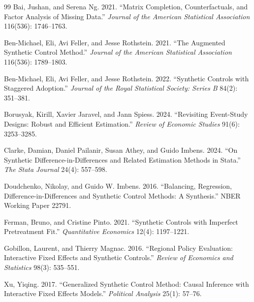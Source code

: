 \documentclass[11pt]{article}
\theoremstyle{definition}
\theoremstyle{plain}
\theoremstyle{remark}
\begin{document}
\begin{thebibliography}{99}
Bai, Jushan, and Serena Ng. 2021. ``Matrix Completion, Counterfactuals, and Factor Analysis of Missing Data.'' \emph{Journal of the American Statistical Association} 116(536): 1746--1763.

Ben-Michael, Eli, Avi Feller, and Jesse Rothstein. 2021. ``The Augmented Synthetic Control Method.'' \emph{Journal of the American Statistical Association} 116(536): 1789--1803.

Ben-Michael, Eli, Avi Feller, and Jesse Rothstein. 2022. ``Synthetic Controls with Staggered Adoption.'' \emph{Journal of the Royal Statistical Society: Series B} 84(2): 351--381.

Borusyak, Kirill, Xavier Jaravel, and Jann Spiess. 2024. ``Revisiting Event-Study Designs: Robust and Efficient Estimation.'' \emph{Review of Economic Studies} 91(6): 3253--3285.

Clarke, Damian, Daniel Pailanir, Susan Athey, and Guido Imbens. 2024. ``On Synthetic Difference-in-Differences and Related Estimation Methods in Stata.'' \emph{The Stata Journal} 24(4): 557--598.

Doudchenko, Nikolay, and Guido W. Imbens. 2016. ``Balancing, Regression, Difference-in-Differences and Synthetic Control Methods: A Synthesis.'' NBER Working Paper 22791.

Ferman, Bruno, and Cristine Pinto. 2021. ``Synthetic Controls with Imperfect Pretreatment Fit.'' \emph{Quantitative Economics} 12(4): 1197--1221.

Gobillon, Laurent, and Thierry Magnac. 2016. ``Regional Policy Evaluation: Interactive Fixed Effects and Synthetic Controls.'' \emph{Review of Economics and Statistics} 98(3): 535--551.

Xu, Yiqing. 2017. ``Generalized Synthetic Control Method: Causal Inference with Interactive Fixed Effects Models.'' \emph{Political Analysis} 25(1): 57--76.
\end{thebibliography}
\end{document}
